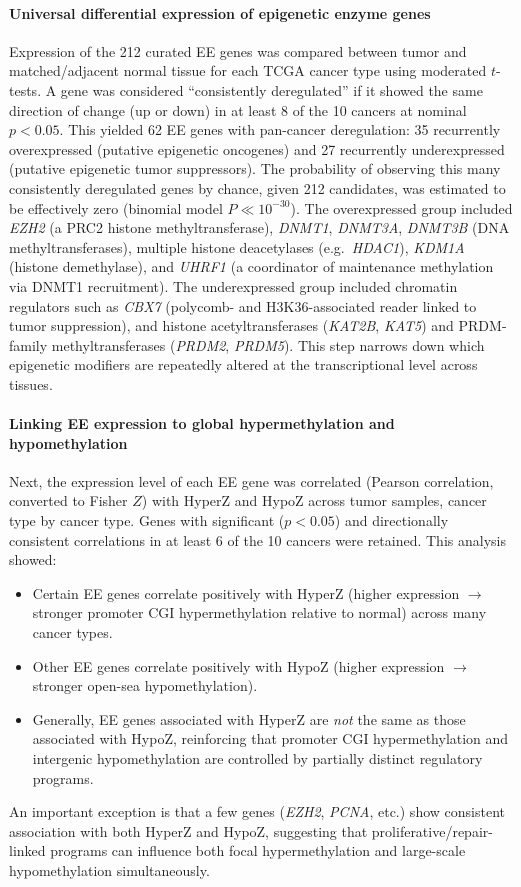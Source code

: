 \documentclass[10pt]{extarticle}
\begin{document}
\paragraph{Universal differential expression of epigenetic enzyme genes}
Expression of the 212 curated EE genes was compared between tumor and matched/adjacent normal tissue for each TCGA cancer type using moderated $t$-tests. A gene was considered ``consistently deregulated'' if it showed the same direction of change (up or down) in at least 8 of the 10 cancers at nominal $p < 0.05$. This yielded 62 EE genes with pan-cancer deregulation: 35 recurrently overexpressed (putative epigenetic oncogenes) and 27 recurrently underexpressed (putative epigenetic tumor suppressors). The probability of observing this many consistently deregulated genes by chance, given 212 candidates, was estimated to be effectively zero (binomial model $P \ll 10^{-30}$). The overexpressed group included \textit{EZH2} (a PRC2 histone methyltransferase), \textit{DNMT1}, \textit{DNMT3A}, \textit{DNMT3B} (DNA methyltransferases), multiple histone deacetylases (e.g.\ \textit{HDAC1}), \textit{KDM1A} (histone demethylase), and \textit{UHRF1} (a coordinator of maintenance methylation via DNMT1 recruitment). The underexpressed group included chromatin regulators such as \textit{CBX7} (polycomb- and H3K36-associated reader linked to tumor suppression), and histone acetyltransferases (\textit{KAT2B}, \textit{KAT5}) and PRDM-family methyltransferases (\textit{PRDM2}, \textit{PRDM5}). This step narrows down which epigenetic modifiers are repeatedly altered at the transcriptional level across tissues.

\paragraph{Linking EE expression to global hypermethylation and hypomethylation}
Next, the expression level of each EE gene was correlated (Pearson correlation, converted to Fisher $Z$) with HyperZ and HypoZ across tumor samples, cancer type by cancer type. Genes with significant ($p<0.05$) and directionally consistent correlations in at least 6 of the 10 cancers were retained. This analysis showed:
\begin{itemize}[label=-]
    \item Certain EE genes correlate positively with HyperZ (higher expression $\rightarrow$ stronger promoter CGI hypermethylation relative to normal) across many cancer types.
    \item Other EE genes correlate positively with HypoZ (higher expression $\rightarrow$ stronger open-sea hypomethylation).
    \item Generally, EE genes associated with HyperZ are \textit{not} the same as those associated with HypoZ, reinforcing that promoter CGI hypermethylation and intergenic hypomethylation are controlled by partially distinct regulatory programs.
\end{itemize}
An important exception is that a few genes (\textit{EZH2}, \textit{PCNA}, etc.) show consistent association with both HyperZ and HypoZ, suggesting that proliferative/repair-linked programs can influence both focal hypermethylation and large-scale hypomethylation simultaneously.
\end{document}
